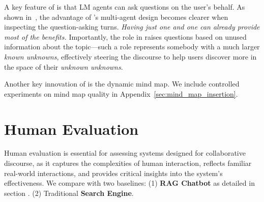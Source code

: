 \documentclass[11pt]{article}
\begin{document}
A key feature of \system is that LM agents can ask questions on the user's behalf. As shown in~, the advantage of \system's multi-agent design becomes clearer when inspecting the question-asking turns. \textit{Having just one \expert and one \moderator can already provide most of the benefits.} Importantly, the \moderator role in \system raises questions based on unused information about the topic---such a role represents somebody with a much larger \textit{known unknowns}, effectively steering the discourse to help users discover more in the space of their \textit{unknown unknowns}.

Another key innovation of \system is the dynamic mind map. %
We include controlled experiments on mind map quality in Appendix~\ref{sec:mind_map_insertion}.





\section{Human Evaluation}
\label{sec:human_eval}

Human evaluation is essential for assessing systems designed for collaborative discourse, as it captures the complexities of human interaction, reflects familiar real-world interactions, and provides critical insights into the system’s effectiveness. We compare \system with two baselines: (1) \textbf{RAG Chatbot} as detailed in section . (2) Traditional \textbf{Search Engine}.
\end{document}
